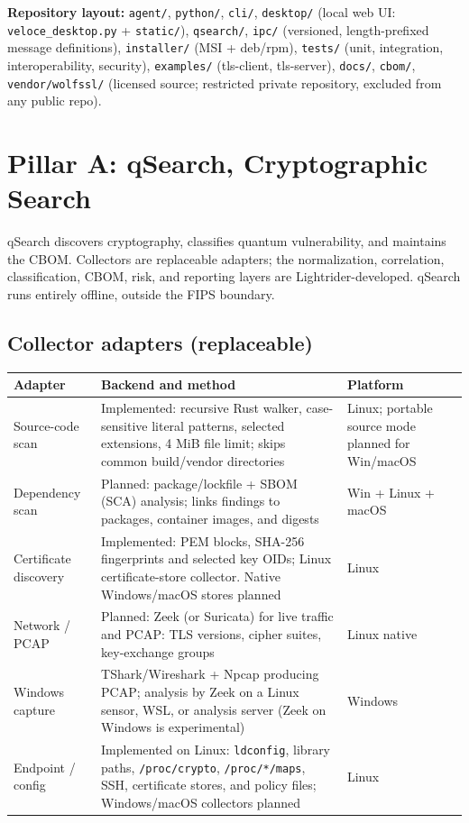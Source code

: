 \documentclass[10pt]{article}
\newcommand{\code}[1]{\texttt{\small #1}}
\begin{document}
\textbf{Repository layout:}
\code{agent/}, \code{python/}, \code{cli/}, \code{desktop/} (local web UI:
\code{veloce\_desktop.py} + \code{static/}), \code{qsearch/}, \code{ipc/} (versioned,
length-prefixed message definitions), \code{installer/} (MSI + deb/rpm), \code{tests/}
(unit, integration, interoperability, security), \code{examples/} (tls-client, tls-server),
\code{docs/}, \code{cbom/}, \code{vendor/wolfssl/} (licensed source; restricted private
repository, excluded from any public repo).

\section{Pillar A: qSearch, Cryptographic Search}\label{sec:qsearch}

qSearch discovers cryptography, classifies quantum vulnerability, and maintains the CBOM.
Collectors are replaceable adapters; the normalization, correlation, classification,
CBOM, risk, and reporting layers are Lightrider-developed. qSearch runs entirely offline,
outside the FIPS boundary.

\subsection{Collector adapters (replaceable)}
\begin{small}
\begin{tabularx}{\textwidth}{@{}lLl@{}}
\toprule
\textbf{Adapter} & \textbf{Backend and method} & \textbf{Platform} \\
\midrule
Source-code scan & Implemented: recursive Rust walker, case-sensitive literal patterns,
  selected extensions, 4 MiB file limit; skips common build/vendor directories & Linux;
  portable source mode planned for Win/macOS \\
Dependency scan & Planned: package/lockfile + SBOM (SCA) analysis; links findings to
  packages, container images, and digests & Win + Linux + macOS \\
Certificate discovery & Implemented: PEM blocks, SHA-256 fingerprints and selected key
  OIDs; Linux certificate-store collector. Native Windows/macOS stores planned & Linux \\
Network / PCAP & Planned: Zeek (or Suricata) for live traffic and PCAP: TLS versions,
  cipher suites, key-exchange groups & Linux native \\
Windows capture & TShark/Wireshark + Npcap producing PCAP; analysis by Zeek on a Linux
  sensor, WSL, or analysis server (Zeek on Windows is experimental) & Windows \\
Endpoint / config & Implemented on Linux: \code{ldconfig}, library paths,
  \code{/proc/crypto}, \code{/proc/*/maps}, SSH, certificate stores, and policy files;
  Windows/macOS collectors planned & Linux \\
\bottomrule
\end{tabularx}
\end{small}
\end{document}
